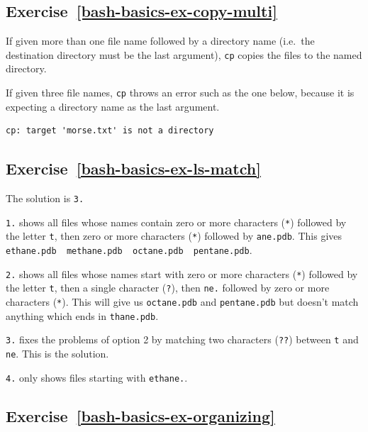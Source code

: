 \documentclass[
]{krantz}
\begin{document}
\hypertarget{exercise-refbash-basics-ex-copy-multi}{%
\subsection*{Exercise~\ref{bash-basics-ex-copy-multi}}\label{exercise-refbash-basics-ex-copy-multi}}


If given more than one file name followed by a directory name (i.e.~the destination directory must
be the last argument), \texttt{cp} copies the files to the named directory.

If given three file names, \texttt{cp} throws an error such as the one below, because it is expecting a directory
name as the last argument.

\begin{verbatim}
cp: target 'morse.txt' is not a directory
\end{verbatim}

\hypertarget{exercise-refbash-basics-ex-ls-match}{%
\subsection*{Exercise~\ref{bash-basics-ex-ls-match}}\label{exercise-refbash-basics-ex-ls-match}}


The solution is \texttt{3.}

\texttt{1.} shows all files whose names contain zero or more characters (\texttt{*}) followed by the letter \texttt{t},
then zero or more characters (\texttt{*}) followed by \texttt{ane.pdb}.
This gives \texttt{ethane.pdb\ \ methane.pdb\ \ octane.pdb\ \ pentane.pdb}.

\texttt{2.} shows all files whose names start with zero or more characters (\texttt{*}) followed by the letter \texttt{t},
then a single character (\texttt{?}), then \texttt{ne.} followed by zero or more characters (\texttt{*}).
This will give us \texttt{octane.pdb} and \texttt{pentane.pdb} but doesn't match anything which ends in \texttt{thane.pdb}.

\texttt{3.} fixes the problems of option 2 by matching two characters (\texttt{??}) between \texttt{t} and \texttt{ne}.
This is the solution.

\texttt{4.} only shows files starting with \texttt{ethane.}.

\hypertarget{exercise-refbash-basics-ex-organizing}{%
\subsection*{Exercise~\ref{bash-basics-ex-organizing}}\label{exercise-refbash-basics-ex-organizing}}
\end{document}
